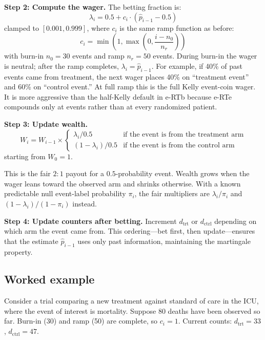 \documentclass[10pt]{article}
\begin{document}
\textbf{Step 2: Compute the wager.} The betting fraction is:
\begin{equation}
\lambda_i = 0.5 + c_i \cdot (\hat{p}_{i-1} - 0.5)
\end{equation}
clamped to $[0.001, 0.999]$, where $c_i$ is the same ramp function as before:
\begin{equation}
c_i = \min\left(1, \max\left(0, \frac{i - n_0}{n_r}\right)\right)
\end{equation}
with burn-in $n_0 = 30$ events and ramp $n_r = 50$ events. During burn-in the wager is neutral; after the ramp completes, $\lambda_i = \hat{p}_{i-1}$. For example, if 40\% of past events came from treatment, the next wager places 40\% on ``treatment event'' and 60\% on ``control event.'' At full ramp this is the full Kelly event-coin wager. It is more aggressive than the half-Kelly default in e-RTb because e-RTe compounds only at events rather than at every randomized patient.

\textbf{Step 3: Update wealth.}
\begin{equation}
W_i = W_{i-1} \times
\begin{cases}
\lambda_i / 0.5 & \text{if the event is from the treatment arm} \\
(1 - \lambda_i) / 0.5 & \text{if the event is from the control arm}
\end{cases}
\end{equation}
starting from $W_0 = 1$.

This is the fair $2:1$ payout for a $0.5$-probability event. Wealth grows when the wager leans toward the observed arm and shrinks otherwise.
With a known predictable null event-label probability $\pi_i$, the fair multipliers are $\lambda_i/\pi_i$ and $(1-\lambda_i)/(1-\pi_i)$ instead.

\textbf{Step 4: Update counters after betting.} Increment $d_{\text{trt}}$ or $d_{\text{ctrl}}$ depending on which arm the event came from. This ordering---bet first, then update---ensures that the estimate $\hat{p}_{i-1}$ uses only past information, maintaining the martingale property.

\subsection{Worked example}

Consider a trial comparing a new treatment against standard of care in the ICU, where the event of interest is mortality. Suppose 80 deaths have been observed so far. Burn-in (30) and ramp (50) are complete, so $c_i = 1$. Current counts: $d_{\text{trt}} = 33$, $d_{\text{ctrl}} = 47$.
\end{document}
